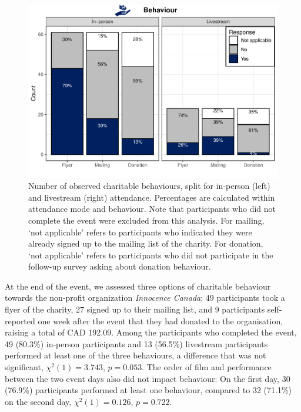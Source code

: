 \documentclass[
  man,floatsintext]{apa6}
\begin{document}
\begin{figure}
\includegraphics[width=1\linewidth]{Schlichting_MSc_Thesis_files/figure-latex/count-behaviour-1} \caption{Number of observed charitable behaviours, split for in-person (left) and livestream (right) attendance. Percentages are calculated within attendance mode and behaviour. Note that participants who did not complete the event were excluded from this analysis. For mailing, `not applicable' refers to participants who indicated they were already signed up to the mailing list of the charity. For donation, `not applicable' refers to participants who did not participate in the follow-up survey asking about donation behaviour.}\label{fig:count-behaviour}
\end{figure}

At the end of the event, we assessed three options of charitable behaviour towards the non-profit organization \emph{Innocence Canada}: 49 participants took a flyer of the charity, 27 signed up to their mailing list, and 9 participants self-reported one week after the event that they had donated to the organisation, raising a total of CAD 192.09. Among the participants who completed the event, 49 (80.3\%) in-person participants and 13 (56.5\%) livestream participants performed at least one of the three behaviours, a difference that was not significant, \(\chi^2(1) = 3.743\), \(p = 0.053\). The order of film and performance between the two event days also did not impact behaviour: On the first day, 30 (76.9\%) participants performed at least one behaviour, compared to 32 (71.1\%) on the second day, \(\chi^2(1) = 0.126\), \(p = 0.722\).
\end{document}
